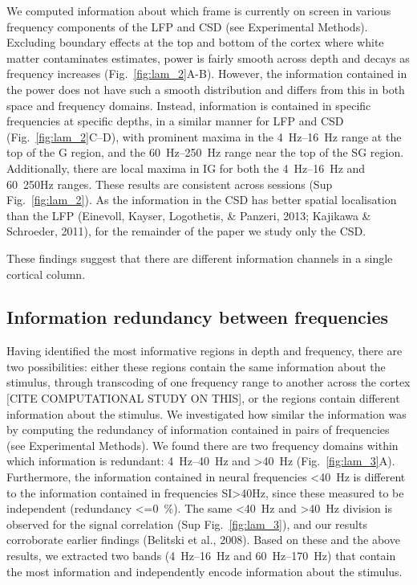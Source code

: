 We computed information about which frame is currently on screen in various frequency components of the \ac{LFP} and \ac{CSD} (see Experimental Methods).
Excluding boundary effects at the top and bottom of the cortex where white matter contaminates estimates, power is fairly smooth across depth and decays as frequency increases (Fig.~\ref{fig:lam_2}A-B).
However, the information contained in the power does not have such a smooth distribution and differs from this in both space and frequency domains.
Instead, information is contained in specific frequencies at specific depths, in a similar manner for \ac{LFP} and \ac{CSD} (Fig.~\ref{fig:lam_2}C--D), with prominent maxima in the \SIrange{4}{16}{Hz} range at the top of the \ac{G} region, and the \SIrange{60}{250}{Hz} range near the top of the \ac{SG} region.
Additionally, there are local maxima in \ac{IG} for both the \SIrange{4}{16}{Hz} and \SI{60}{250}{Hz} ranges.
These results are consistent across sessions (Sup Fig.~\ref{fig:lam_2}).
As the information in the \ac{CSD} has better spatial localisation than the \ac{LFP} (Einevoll, Kayser, Logothetis, \& Panzeri, 2013; Kajikawa \& Schroeder, 2011), for the remainder of the paper we study only the \ac{CSD}.

These findings suggest that there are different information channels in a single cortical column.

\subsection{Information redundancy between frequencies}
Having identified the most informative regions in depth and frequency, there are two possibilities: either these regions contain the same information about the stimulus, through transcoding of one frequency range to another across the cortex [CITE COMPUTATIONAL STUDY ON THIS], or the regions contain different information about the stimulus.
We investigated how similar the information was by computing the redundancy of information contained in pairs of frequencies (see Experimental Methods).
We found there are two frequency domains within which information is redundant: \SIrange{4}{40}{Hz} and \SI{>40}{Hz} (Fig.~\ref{fig:lam_3}A).
Furthermore, the information contained in neural frequencies \SI{<40}{Hz} is different to the information contained in frequencies SI{>40}{Hz}, since these measured to be independent (redundancy \SI{<=0}{\percent}).
The same \SI{<40}{Hz} and \SI{>40}{Hz} division is observed for the signal correlation (Sup Fig.~\ref{fig:lam_3}), and our results corroborate earlier findings (Belitski et al., 2008).
Based on these and the above results, we extracted two bands (\SIrange{4}{16}{Hz} and \SIrange{60}{170}{Hz}) that contain the most information and independently encode information about the stimulus.

